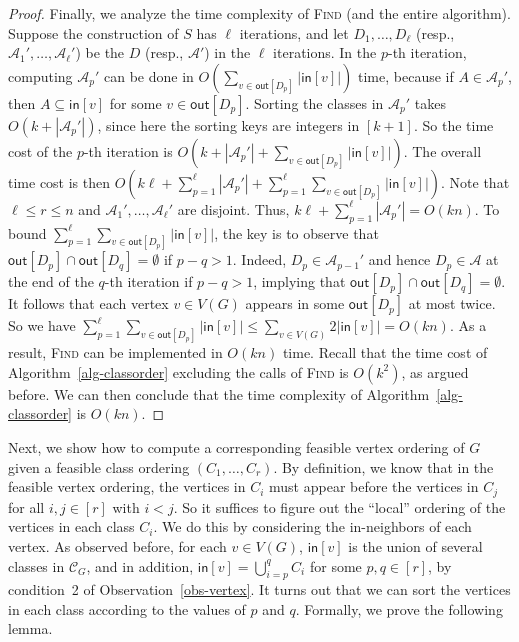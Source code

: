 \documentclass[11pt]{article}
\begin{document}
\begin{proof}
Finally, we analyze the time complexity of \textsc{Find} (and the entire algorithm).
Suppose the construction of $S$ has $\ell$ iterations, and let $D_1,\dots,D_\ell$ (resp., $\mathcal{A}_1',\dots,\mathcal{A}_\ell'$) be the $D$ (resp., $\mathcal{A}'$) in the $\ell$ iterations.
In the $p$-th iteration, computing $\mathcal{A}_p'$ can be done in $O(\sum_{v \in \mathsf{out}[D_p]} |\mathsf{in}[v]|)$ time, because if $A \in \mathcal{A}_p'$, then $A \subseteq \mathsf{in}[v]$ for some $v \in \mathsf{out}[D_p]$.
Sorting the classes in $\mathcal{A}_p'$ takes $O(k+|\mathcal{A}_p'|)$, since here the sorting keys are integers in $[k+1]$.
So the time cost of the $p$-th iteration is $O(k+|\mathcal{A}_p'|+\sum_{v \in \mathsf{out}[D_p]} |\mathsf{in}[v]|)$.
The overall time cost is then $O(k \ell + \sum_{p=1}^\ell |\mathcal{A}_p'| + \sum_{p=1}^\ell \sum_{v \in \mathsf{out}[D_p]} |\mathsf{in}[v]|)$.
Note that $\ell \leq r \leq n$ and $\mathcal{A}_1',\dots,\mathcal{A}_\ell'$ are disjoint.
Thus, $k \ell + \sum_{p=1}^\ell |\mathcal{A}_p'| = O(kn)$.
To bound $\sum_{p=1}^\ell \sum_{v \in \mathsf{out}[D_p]} |\mathsf{in}[v]|$, the key is to observe that $\mathsf{out}[D_p] \cap \mathsf{out}[D_q] = \emptyset$ if $p-q>1$.
Indeed, $D_p \in \mathcal{A}_{p-1}'$ and hence $D_p \in \mathcal{A}$ at the end of the $q$-th iteration if $p-q>1$, implying that $\mathsf{out}[D_p] \cap \mathsf{out}[D_q] = \emptyset$.
It follows that each vertex $v \in V(G)$ appears in some $\mathsf{out}[D_p]$ at most twice.
So we have $\sum_{p=1}^\ell \sum_{v \in \mathsf{out}[D_p]} |\mathsf{in}[v]| \leq \sum_{v \in V(G)} 2|\mathsf{in}[v]| = O(kn)$.
As a result, \textsc{Find} can be implemented in $O(kn)$ time.
Recall that the time cost of Algorithm~\ref{alg-classorder} excluding the calls of \textsc{Find} is $O(k^2)$, as argued before.
We can then conclude that the time complexity of Algorithm~\ref{alg-classorder} is $O(kn)$.
\end{proof}

Next, we show how to compute a corresponding feasible vertex ordering of $G$ given a feasible class ordering $(C_1,\dots,C_r)$.
By definition, we know that in the feasible vertex ordering, the vertices in $C_i$ must appear before the vertices in $C_j$ for all $i,j \in [r]$ with $i < j$.
So it suffices to figure out the ``local'' ordering of the vertices in each class $C_i$.
We do this by considering the in-neighbors of each vertex.
As observed before, for each $v \in V(G)$, $\mathsf{in}[v]$ is the union of several classes in $\mathcal{C}_G$, and in addition, $\mathsf{in}[v] = \bigcup_{i=p}^q C_i$ for some $p,q \in [r]$, by condition~2 of Observation~\ref{obs-vertex}.
It turns out that we can sort the vertices in each class according to the values of $p$ and $q$.
Formally, we prove the following lemma.
\end{document}
